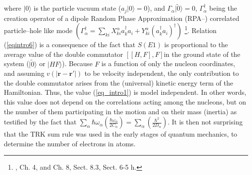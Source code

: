 where $|0\rangle$ is the particle vacuum state ($a_j|0\rangle=0$), and $\Gamma_\alpha|\tilde 0\rangle=0$, $\Gamma^\dagger_\alpha$ being the creation operator of a dipole Random Phase Approximation (RPA--) correlated particle--hole like mode $(\Gamma_\alpha^\dagger=\sum_{ki}X_{ki}^\alpha a_k^\dagger a_i+Y^\alpha_{ki}(a_k^\dagger a_i)^\dagger)$ \footnote{\cite{Bertsch:05}, Ch. 4, and \cite{Brink:05} Ch. 8, Sect. 8.3, \cite{Bohr:75} Sect. 6-5 h.}. Relation (\ref{eqintro6}) is a consequence of the fact that $S(E1)$ is proportional to the average value of the double  commutator $[[H,F],F]$in the ground state of the system ($|\tilde 0\rangle$ or $|HF\rangle$). Because $F$ is a function of only the nucleon coordinates, and assuming $v(|\mathbf{r}-\mathbf{r}'|)$ to be velocity independent, the only contribution to the double commutator arises from the (universal) kinetic energy term of the Hamiltonian. Thus, the value (\ref{eq_intro1}) is model independent. In other words, this value does not depend on the correlations acting among the nucleons, but on the number of them participating in the motion and on their mass (inertia) as testified by the fact that $\sum_{\alpha}\hbar \omega_\alpha\left(\frac{\hbar\omega_\alpha}{2C_\alpha}\right)=\sum_{\alpha}\left(\frac{\hbar^2}{2D_\alpha}\right)$. It is then not surprising that the TRK sum rule was used in the early stages of quantum mechanics, to determine the number of electrons in atoms.


